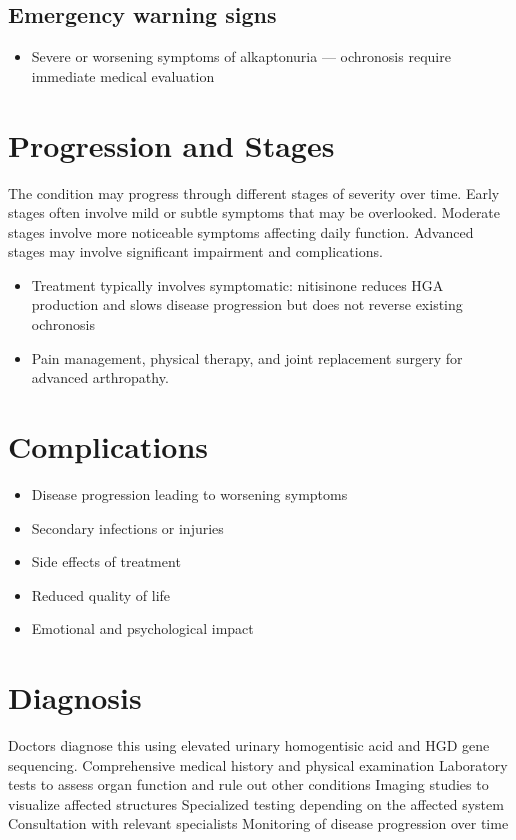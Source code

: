 \subsection{Emergency warning signs}
\begin{itemize}[noitemsep]
  \item Severe or worsening symptoms of alkaptonuria --- ochronosis require immediate medical evaluation
\end{itemize}
\section{Progression and Stages}
The condition may progress through different stages of severity over time. Early stages often involve mild or subtle symptoms that may be overlooked. Moderate stages involve more noticeable symptoms affecting daily function. Advanced stages may involve significant impairment and complications.

\begin{itemize}[noitemsep]
  \item Treatment typically involves symptomatic: nitisinone reduces HGA production and slows disease progression but does not reverse existing ochronosis
  \item Pain management, physical therapy, and joint replacement surgery for advanced arthropathy.
\end{itemize}
\section{Complications}
\begin{itemize}[noitemsep]
  \item Disease progression leading to worsening symptoms
  \item Secondary infections or injuries
  \item Side effects of treatment
  \item Reduced quality of life
  \item Emotional and psychological impact
\end{itemize}
\section{Diagnosis}
Doctors diagnose this using elevated urinary homogentisic acid and HGD gene sequencing. Comprehensive medical history and physical examination Laboratory tests to assess organ function and rule out other conditions Imaging studies to visualize affected structures Specialized testing depending on the affected system Consultation with relevant specialists Monitoring of disease progression over time

